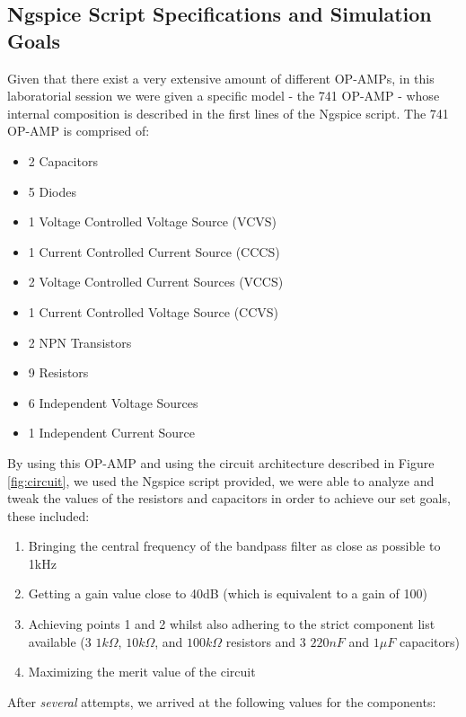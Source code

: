 \subsection{Ngspice Script Specifications and Simulation Goals}
\hspace{12pt} Given that there exist a very extensive amount of different OP-AMPs, in this laboratorial session we were given a specific model - the 741 OP-AMP - whose internal composition is described in the first lines of the Ngspice script. The 741 OP-AMP is comprised of: 

\begin{itemize}
	\item{2 Capacitors}
	\item{5 Diodes}
	\item{1 Voltage Controlled Voltage Source (VCVS)}
	\item{1 Current Controlled Current Source (CCCS)}
	\item{2 Voltage Controlled Current Sources (VCCS)}
	\item{1 Current Controlled Voltage Source (CCVS)}
	\item{2 NPN Transistors}
	\item{9 Resistors}
	\item{6 Independent Voltage Sources}
	\item{1 Independent Current Source}
\end{itemize} 

By using this OP-AMP and using the circuit architecture described in Figure \ref{fig:circuit}, we used the Ngspice script provided, we were able to analyze and tweak the values of the resistors and capacitors in order to achieve our set goals, these included:

\begin{enumerate}
	\item{Bringing the central frequency of the bandpass filter as close as possible to 1kHz}
	\item{Getting a gain value close to 40dB (which is equivalent to a gain of 100)}
	\item{Achieving points 1 and 2 whilst also adhering to the strict component list available (3 $1k\Omega$, $10k\Omega$, and $100k\Omega$ resistors and 3 $220nF$ and $1\mu F$ capacitors)}
	\item{Maximizing the merit value of the circuit}
\end{enumerate}

After \textit{several} attempts, we arrived at the following values for the components: 

